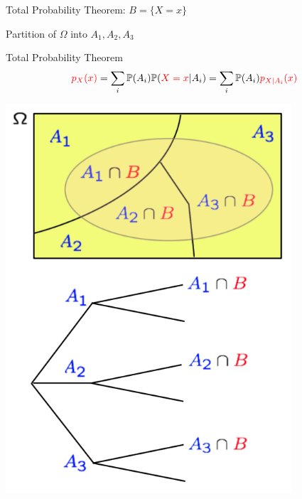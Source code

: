 \begin{frame}{Total Probability Theorem: $B = \{X=x \}$}

{
\plitemsep 0.1in
\bci [$\circ$]

\item Partition of $\Omega$ into $A_1,A_2,A_3$


\bigskip
\medskip

\begin{block}{Total Probability Theorem}
$$
{\color{red} p_X(x)} = \sum_{i} \mathbb{P}( A_i ) \mathbb{P}( {\color{red} X=x} | A_i ) = \sum_{i} \mathbb{P}( A_i ) {\color{red} p_{X|A_i}(x)} 
$$
\end{block}

\eci 
}
{
\centering
\includegraphics[width=0.8\textwidth]{L2_total_ex.png}
}

\end{frame}

